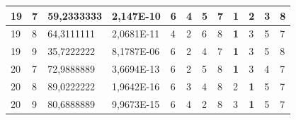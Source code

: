 \documentclass[conference]{IEEEtran}
\begin{document}
\begin{table}[]
\begin{tabular}{|llll|llllllll|}
		\multicolumn{1}{|l|}{19}  & \multicolumn{1}{l|}{7}         & \multicolumn{1}{l|}{59,2333333}    & 2,147E-10  & \multicolumn{1}{l|}{6}   & \multicolumn{1}{l|}{4}          & \multicolumn{1}{l|}{5}          & \multicolumn{1}{l|}{7}   & \multicolumn{1}{l|}{\textbf{1}} & \multicolumn{1}{l|}{2}          & \multicolumn{1}{l|}{3}          & 8                      \\ \hline
		\multicolumn{1}{|l|}{19}  & \multicolumn{1}{l|}{8}         & \multicolumn{1}{l|}{64,3111111}    & 2,0681E-11 & \multicolumn{1}{l|}{4}   & \multicolumn{1}{l|}{2}          & \multicolumn{1}{l|}{6}          & \multicolumn{1}{l|}{8}   & \multicolumn{1}{l|}{\textbf{1}} & \multicolumn{1}{l|}{3}          & \multicolumn{1}{l|}{5}          & 7                      \\ \hline
		\multicolumn{1}{|l|}{19}  & \multicolumn{1}{l|}{9}         & \multicolumn{1}{l|}{35,7222222}    & 8,1787E-06 & \multicolumn{1}{l|}{6}   & \multicolumn{1}{l|}{2}          & \multicolumn{1}{l|}{4}          & \multicolumn{1}{l|}{7}   & \multicolumn{1}{l|}{\textbf{1}} & \multicolumn{1}{l|}{3}          & \multicolumn{1}{l|}{5}          & 8                      \\ \hline
		\multicolumn{1}{|l|}{20}  & \multicolumn{1}{l|}{7}         & \multicolumn{1}{l|}{72,9888889}    & 3,6694E-13 & \multicolumn{1}{l|}{6}   & \multicolumn{1}{l|}{2}          & \multicolumn{1}{l|}{5}          & \multicolumn{1}{l|}{8}   & \multicolumn{1}{l|}{\textbf{1}} & \multicolumn{1}{l|}{3}          & \multicolumn{1}{l|}{4}          & 7                      \\ \hline
		\multicolumn{1}{|l|}{20}  & \multicolumn{1}{l|}{8}         & \multicolumn{1}{l|}{89,0222222}    & 1,9642E-16 & \multicolumn{1}{l|}{6}   & \multicolumn{1}{l|}{3}          & \multicolumn{1}{l|}{4}          & \multicolumn{1}{l|}{8}   & \multicolumn{1}{l|}{2}          & \multicolumn{1}{l|}{\textbf{1}} & \multicolumn{1}{l|}{5}          & 7                      \\ \hline
		\multicolumn{1}{|l|}{20}  & \multicolumn{1}{l|}{9}         & \multicolumn{1}{l|}{80,6888889}    & 9,9673E-15 & \multicolumn{1}{l|}{6}   & \multicolumn{1}{l|}{4}          & \multicolumn{1}{l|}{2}          & \multicolumn{1}{l|}{8}   & \multicolumn{1}{l|}{3}          & \multicolumn{1}{l|}{\textbf{1}} & \multicolumn{1}{l|}{5}          & 7                      \\ \hline
	\end{tabular}
\end{table}
\end{document}
